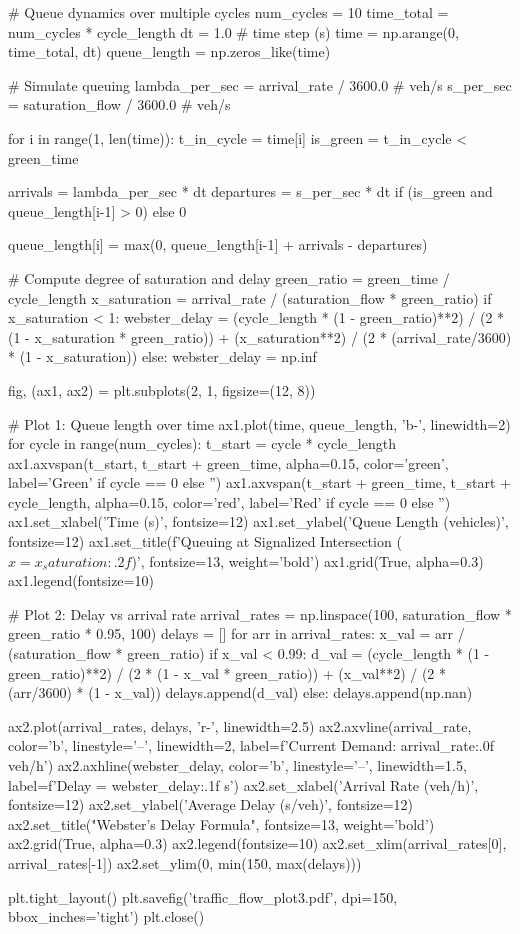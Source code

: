 \documentclass[11pt,a4paper]{article}
\begin{document}
\begin{pycode}
# Queue dynamics over multiple cycles
num_cycles = 10
time_total = num_cycles * cycle_length
dt = 1.0  # time step (s)
time = np.arange(0, time_total, dt)
queue_length = np.zeros_like(time)

# Simulate queuing
lambda_per_sec = arrival_rate / 3600.0  # veh/s
s_per_sec = saturation_flow / 3600.0  # veh/s

for i in range(1, len(time)):
    t_in_cycle = time[i] %
    is_green = t_in_cycle < green_time

    arrivals = lambda_per_sec * dt
    departures = s_per_sec * dt if (is_green and queue_length[i-1] > 0) else 0

    queue_length[i] = max(0, queue_length[i-1] + arrivals - departures)

# Compute degree of saturation and delay
green_ratio = green_time / cycle_length
x_saturation = arrival_rate / (saturation_flow * green_ratio)
if x_saturation < 1:
    webster_delay = (cycle_length * (1 - green_ratio)**2) / (2 * (1 - x_saturation * green_ratio)) + (x_saturation**2) / (2 * (arrival_rate/3600) * (1 - x_saturation))
else:
    webster_delay = np.inf

fig, (ax1, ax2) = plt.subplots(2, 1, figsize=(12, 8))

# Plot 1: Queue length over time
ax1.plot(time, queue_length, 'b-', linewidth=2)
for cycle in range(num_cycles):
    t_start = cycle * cycle_length
    ax1.axvspan(t_start, t_start + green_time, alpha=0.15, color='green', label='Green' if cycle == 0 else '')
    ax1.axvspan(t_start + green_time, t_start + cycle_length, alpha=0.15, color='red', label='Red' if cycle == 0 else '')
ax1.set_xlabel('Time (s)', fontsize=12)
ax1.set_ylabel('Queue Length (vehicles)', fontsize=12)
ax1.set_title(f'Queuing at Signalized Intersection ($x = {x_saturation:.2f}$)', fontsize=13, weight='bold')
ax1.grid(True, alpha=0.3)
ax1.legend(fontsize=10)

# Plot 2: Delay vs arrival rate
arrival_rates = np.linspace(100, saturation_flow * green_ratio * 0.95, 100)
delays = []
for arr in arrival_rates:
    x_val = arr / (saturation_flow * green_ratio)
    if x_val < 0.99:
        d_val = (cycle_length * (1 - green_ratio)**2) / (2 * (1 - x_val * green_ratio)) + (x_val**2) / (2 * (arr/3600) * (1 - x_val))
        delays.append(d_val)
    else:
        delays.append(np.nan)

ax2.plot(arrival_rates, delays, 'r-', linewidth=2.5)
ax2.axvline(arrival_rate, color='b', linestyle='--', linewidth=2, label=f'Current Demand: {arrival_rate:.0f} veh/h')
ax2.axhline(webster_delay, color='b', linestyle='--', linewidth=1.5, label=f'Delay = {webster_delay:.1f} s')
ax2.set_xlabel('Arrival Rate (veh/h)', fontsize=12)
ax2.set_ylabel('Average Delay (s/veh)', fontsize=12)
ax2.set_title("Webster's Delay Formula", fontsize=13, weight='bold')
ax2.grid(True, alpha=0.3)
ax2.legend(fontsize=10)
ax2.set_xlim(arrival_rates[0], arrival_rates[-1])
ax2.set_ylim(0, min(150, max(delays)))

plt.tight_layout()
plt.savefig('traffic_flow_plot3.pdf', dpi=150, bbox_inches='tight')
plt.close()
\end{pycode}
\end{document}
